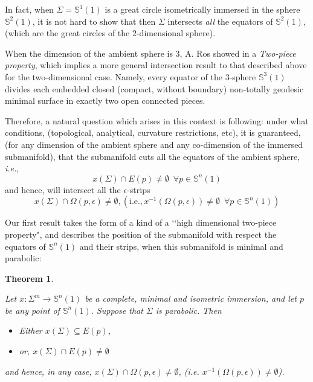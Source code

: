 \documentclass[11pt,letterpaper]{amsart}
\newtheorem{theorem}{Theorem}[section]
\theoremstyle{definition}
\theoremstyle{remark}
\begin{document}
     In fact, when $\Sigma=\mathbb{S}^{1}(1)$ is a great circle isometrically immersed in the sphere $\mathbb{S}^{2}(1)$, it is not hard to show that then $\Sigma$ intersects {\em all} the equators of $ \mathbb{S}^{2}(1)$, (which are the great circles of the $2$-dimensional sphere).
     
     When the dimension of the ambient sphere is $3$, A. Ros showed in \cite{R} a {\em Two-piece property}, which implies a more general intersection result to that described above for the two-dimensional case. Namely, every equator of the 3-sphere $\mathbb{S}^3(1)$ divides each embedded closed (compact, without boundary) non-totally geodesic minimal surface in exactly two open connected pieces.
     
    
  Therefore,  a natural question which arises in this context is following: under what conditions, (topological, analytical, curvature restrictions, etc), it is guaranteed, (for any dimension of the ambient sphere and any co-dimension of the immersed submanifold), that the submanifold cuts all the equators of the ambient sphere, \emph{i.e.},
        $$x(\Sigma) \cap E(p) \neq \emptyset\,\,\,\forall p \in \mathbb{S}^n(1)$$ and hence, will intersect all the $\epsilon$-strips
        $$x(\Sigma) \cap \Omega(p,\epsilon) \neq \emptyset, (\text{i.e.}, x^{-1}(\Omega(p,\epsilon))\neq \emptyset\,\,\,\forall p \in \mathbb{S}^n(1))$$
   
    Our first result  takes the form of a kind of a \lq\lq high dimensional two-piece property", and describes the position of the submanifold with respect the equators of $\mathbb{S}^n(1)$ and their strips, when this submanifold is minimal and parabolic:
 
\begin{theorem}\label{twopiecegeneral}

Let $x:\Sigma^m \to \mathbb{S}^n(1)$ be a complete,  minimal and isometric immersion, and let $p$ be any point of $\mathbb{S}^n(1)$. Suppose that $\Sigma$ is parabolic. Then
    \begin{itemize}
        \item Either $x(\Sigma)\subseteq E(p)$, 
        \item or, $x(\Sigma)\cap E(p)\neq \emptyset$
            \end{itemize}
            and  hence, in any case,  $x(\Sigma) \cap \Omega(p,\epsilon) \neq \emptyset$, (i.e. $x^{-1}(\Omega(p,\epsilon))\neq \emptyset$).
\end{theorem}
\end{document}
